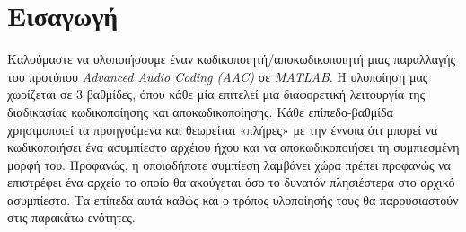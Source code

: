 \section*{Εισαγωγή}

Καλούμαστε να υλοποιήσουμε έναν κωδικοποιητή/αποκωδικοποιητή μιας παραλλαγής
του προτύπου \emph{Advanced Audio Coding (AAC)} σε \emph{MATLAB}. Η υλοποίηση
μας χωρίζεται σε 3 βαθμίδες, όπου κάθε μία επιτελεί μια διαφορετική λειτουργία
της διαδικασίας κωδικοποίησης και αποκωδικοποίησης. Κάθε επίπεδο-βαθμίδα
χρησιμοποιεί τα προηγούμενα και θεωρείται «πλήρες» με την έννοια ότι μπορεί να
κωδικοποιήσει ένα ασυμπίεστο αρχέιου ήχου και να αποκωδικοποιήσει τη
συμπιεσμένη μορφή του. Προφανώς, η οποιαδήποτε συμπίεση λαμβάνει χώρα πρέπει
προφανώς να επιστρέφει ένα αρχείο το οποίο θα ακούγεται όσο το δυνατόν
πλησιέστερα στο αρχικό ασυμπίεστο. Τα επίπεδα αυτά καθώς και ο τρόπος
υλοποίησής τους θα παρουσιαστούν στις παρακάτω ενότητες.